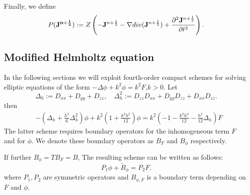 \documentclass[12pt,reqno]{amsart}
\newtheorem{proposition}[theorem]{Proposition}
\theoremstyle{definition}
\numberwithin{equation}{section}
\begin{document}


	
	Finally, we define 
	$$
	P({\bf J^{n+\frac{1}{2}}}):=Z\left ( -{\bf J}^{n+\frac{1}{2}}-\nabla div({\bf J}^{n+\frac{1}{2}})+\frac{\partial^2{\bf J}^{n+\frac{1}{2}}}{\partial t^2}\right ).
	$$
   \subsection{Modified Helmholtz equation}
   In the following sections we will exploit fourth-order compact schemes for solving elliptic equations of the form $-\Delta \phi+k^2\phi=k^2F$,$k>0$.
Let 
$$
\Delta_h:=D_{xx}+D_{yy}+D_{zz}, \quad \Delta^2_h:= D_{zz}D_{xx}+D_{yy}D_{zz}+D_{xx}D_{zz}.
$$
then 
\begin{align*}
	&
	-\left (
	\Delta_h+\frac{h^2}{6}\Delta^2_h
	\right)\phi+
	k^2\left (
	1+\frac{k^2h^2}{12}
	\right)\phi=
	k^2\left (
	-1-\frac{k^2h^2}{12}
	-\frac{h^2}{12}\Delta_h
	\right)F
\end{align*}
The latter scheme requires boundary operators for the inhomogeneous term $F$ and for $\phi$. We denote these boundary operators as 
$B_{F}$ and $B_{\phi}$ respectively.


If further $B_{\phi}=TB_{F}=B$, 
The resulting scheme can be written as follows:
$$
P_1\phi+\widetilde{B}_{\phi}=P_2F.
$$
where $P_1,P_2$ are symmetric operators and $B_{\phi,F}$ is a boundary term depending on $F$ and $\phi$.
   
\end{document}
